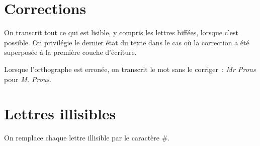 \documentclass[a4paper,12pt,twoside]{book}
\begin{document}
		\section{Corrections}
		On transcrit tout ce qui est lisible, y compris les lettres biffées, lorsque c'est possible. On privilégie le dernier état du texte dans le cas où la correction a été superposée à la première couche d'écriture.
		
		Lorsque l'orthographe est erronée, on transcrit le mot sans le corriger~: \textit{Mr Prons} pour \textit{M. Prous}.
		
		\section{Lettres illisibles}
		On remplace chaque lettre illisible par le caractère \#.
           	
	\printbibheading[heading=bibintoc]%
	\printbibliography[heading=subbibliography, title=Scripts, keyword=scripts]
\end{document}
